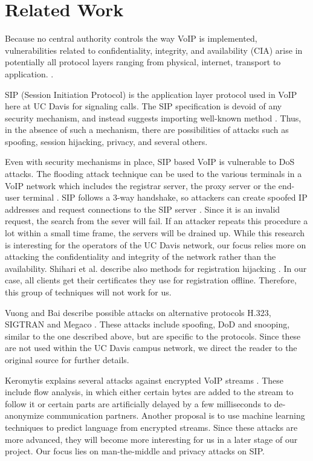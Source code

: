 \section{Related Work}

Because no central authority controls the way VoIP is implemented, vulnerabilities related to confidentiality, integrity, and availability (CIA) arise in potentially all protocol layers ranging from physical, internet, transport to application. \cite{mcgann}. 

SIP (Session Initiation Protocol) is the application layer protocol used in VoIP here at UC Davis for signaling calls. The SIP specification is devoid of any security mechanism, and instead suggests importing well-known method \cite{geneiatakis2006survey}. Thus, in the absence of such a mechanism, there are possibilities of attacks such as spoofing, session hijacking, privacy, and several others.

Even with security mechanisms in place, SIP based VoIP is vulnerable to DoS attacks. The flooding attack technique can be used to the various terminals in a VoIP network which includes the registrar server, the proxy server or the end-user terminal \cite{geneiatakis2006survey}. SIP follows a 3-way handshake, so attackers can create spoofed IP addresses and request connections to the SIP server \cite{srihari}. Since it is an invalid request, the search from the sever will fail. If an attacker repeats this procedure a lot within a small time frame, the servers will be drained up. While this research is interesting for the operators of the UC Davis network, our focus relies more on attacking the confidentiality and integrity of the network rather than the availability. Shihari et al. describe also methods for registration hijacking \cite{srihari}. In our case, all clients get their certificates they use for registration offline. Therefore, this group of techniques will not work for us.

Vuong and Bai describe possible attacks on alternative protocols H.323, SIGTRAN and Megaco \cite{vuong}. These attacks include spoofing, DoD and snooping, similar to the one described above, but are specific to the protocols. Since these are not used within the UC Davis campus network, we direct the reader to the original source for further details.

Keromytis explains several attacks against encrypted VoIP streams \cite{keromytis2012comprehensive}. These include flow analysis, in which either certain bytes are added to the stream to follow it or certain parts are artificially delayed by a few milliseconds to de-anonymize communication partners. Another proposal is to use machine learning techniques to predict language from encrypted streams. Since these attacks are more advanced, they will become more interesting for us in a later stage of our project. Our focus lies on man-the-middle and privacy attacks on SIP.

